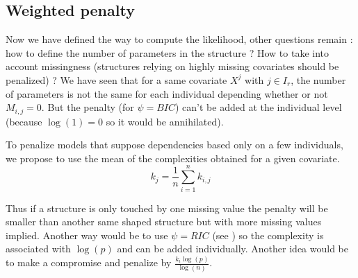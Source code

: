 \documentclass[11pt,a4paper]{report}
\begin{document}
%			
%			
		\subsection{Weighted penalty}
			Now we have defined the way to compute the likelihood, other questions remain : how to define the number of parameters in the structure ?		How to take into account missingness (structures relying on highly missing covariates should be penalized) ?
			We have seen that for a same covariate $X^j$ with $ j \in I_r$, the number of parameters is not the same for each individual depending whether or not $M_{i,j}=0$. But the penalty (for $\psi=BIC$) can't be added at the individual level (because $\log(1)=0$ so it would be annihilated). 
			
			To penalize models that suppose dependencies based only on a few individuals, we propose to use the mean of the complexities obtained for a given covariate.
			\begin{equation}
			k_j=\frac{1}{n}\sum_{i=1}^nk_{i,j}
\end{equation}						
			
			 Thus if a structure is only touched by one missing value the penalty will be smaller than another same shaped structure but with more missing values implied.
			Another way would be to use $\psi=RIC$ (see \cite{foster1994risk}) so the complexity is associated with $\log(p)$ and can be added individually. Another idea would be to make a compromise and penalize by $\frac{k_i\log(p)}{\log(n)}$.
		
\end{document}
